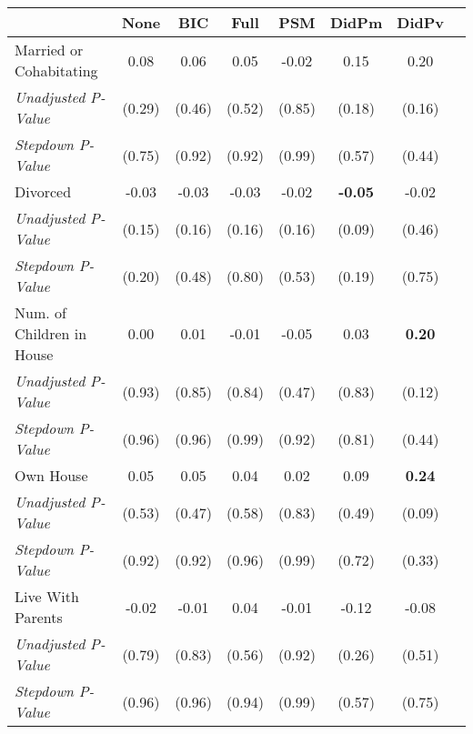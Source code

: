 \begin{tabular}{l c c c c c c c}
\toprule
 & None & BIC & Full & PSM & DidPm & DidPv \\
\midrule
Married or Cohabitating & 0.08 & 0.06 & 0.05 & -0.02 & 0.15 & 0.20 \\
\quad \textit{Unadjusted P-Value} & (0.29) & (0.46) & (0.52) & (0.85) & (0.18) & (0.16) \\
\quad \textit{Stepdown P-Value} & (0.75) & (0.92) & (0.92) & (0.99) & (0.57) & (0.44) \\
Divorced & -0.03 & -0.03 & -0.03 & -0.02 & \textbf{ -0.05 } & -0.02 \\
\quad \textit{Unadjusted P-Value} & (0.15) & (0.16) & (0.16) & (0.16) & (0.09) & (0.46) \\
\quad \textit{Stepdown P-Value} & (0.20) & (0.48) & (0.80) & (0.53) & (0.19) & (0.75) \\
Num. of Children in House & 0.00 & 0.01 & -0.01 & -0.05 & 0.03 & \textbf{ 0.20 } \\
\quad \textit{Unadjusted P-Value} & (0.93) & (0.85) & (0.84) & (0.47) & (0.83) & (0.12) \\
\quad \textit{Stepdown P-Value} & (0.96) & (0.96) & (0.99) & (0.92) & (0.81) & (0.44) \\
Own House & 0.05 & 0.05 & 0.04 & 0.02 & 0.09 & \textbf{ 0.24 } \\
\quad \textit{Unadjusted P-Value} & (0.53) & (0.47) & (0.58) & (0.83) & (0.49) & (0.09) \\
\quad \textit{Stepdown P-Value} & (0.92) & (0.92) & (0.96) & (0.99) & (0.72) & (0.33) \\
Live With Parents & -0.02 & -0.01 & 0.04 & -0.01 & -0.12 & -0.08 \\
\quad \textit{Unadjusted P-Value} & (0.79) & (0.83) & (0.56) & (0.92) & (0.26) & (0.51) \\
\quad \textit{Stepdown P-Value} & (0.96) & (0.96) & (0.94) & (0.99) & (0.57) & (0.75) \\
\bottomrule
\end{tabular}
